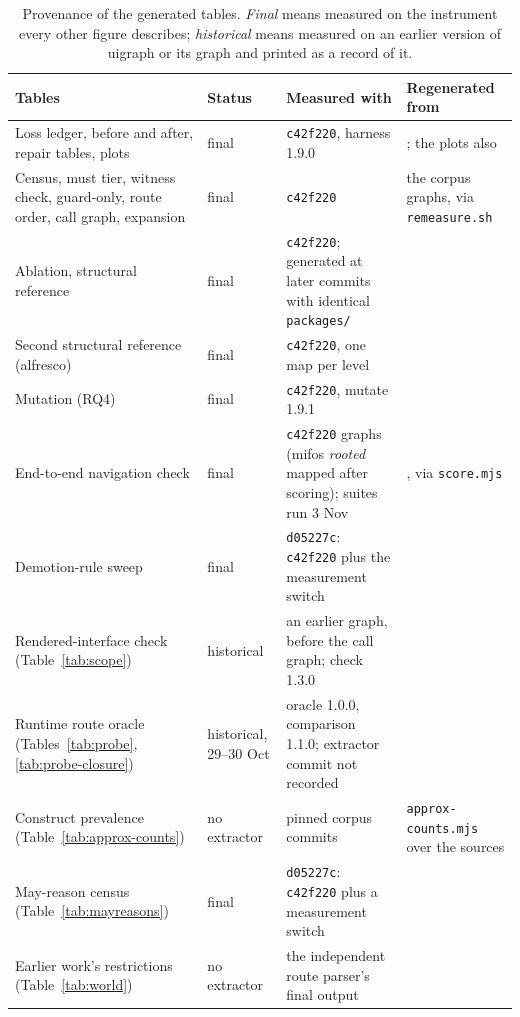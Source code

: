 \begin{table}[t]\footnotesize
\caption{Provenance of the generated tables. \emph{Final} means measured on the instrument
every other figure describes; \emph{historical} means measured on an earlier version of uigraph or its graph
and printed as a record of it.}
\label{tab:provenance}
\begin{tabularx}{\textwidth}{@{}Y>{\raggedright\arraybackslash}p{1.7cm}>{\raggedright\arraybackslash}p{3.3cm}>{\raggedright\arraybackslash}p{3.6cm}@{}}
\toprule
Tables & Status & Measured with & Regenerated from \\
\midrule
Loss ledger, before and after, repair tables, plots & final & \texttt{c42f220}, harness 1.9.0 &
; the plots also  \\
Census, must tier, witness check, guard-only, route order, call graph, expansion & final &
\texttt{c42f220} & the corpus graphs, via \texttt{remeasure.sh} \\
Ablation, structural reference & final & \texttt{c42f220}; generated at later commits with identical \texttt{packages/} &
 \\
Second structural reference (alfresco) & final & \texttt{c42f220}, one map per level &
\allowbreak{} \\
Mutation (RQ4) & final & \texttt{c42f220}, mutate 1.9.1 &  \\
End-to-end navigation check & final & \texttt{c42f220} graphs (mifos \emph{rooted} mapped after scoring); suites run 3 Nov &
, via \texttt{score.mjs} \\
Demotion-rule sweep & final & \texttt{d05227c}: \texttt{c42f220} plus the measurement switch &
 \\
Rendered-interface check (Table~\ref{tab:scope}) & historical & an earlier graph, before the call
graph; check 1.3.0 &  \\
Runtime route oracle (Tables~\ref{tab:probe}, \ref{tab:probe-closure}) & historical, 29--30 Oct &
oracle 1.0.0, comparison 1.1.0; extractor commit not recorded &  \\
Construct prevalence (Table~\ref{tab:approx-counts}) & no extractor & pinned corpus commits & \texttt{approx-counts.mjs} over the sources \\
May-reason census (Table~\ref{tab:mayreasons}) & final & \texttt{d05227c}: \texttt{c42f220} plus a measurement switch &
\allowbreak{} \\
Earlier work's restrictions (Table~\ref{tab:world}) & no extractor & the independent route parser's final output &
 \\
\bottomrule
\end{tabularx}


\end{table}

